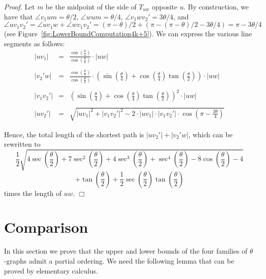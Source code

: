 \documentclass[12pt]{article}
\newenvironment{proof}{\emph{Proof.}}{\hfill $\Box$\\}
\newcommand{\canon}[2]{\ensuremath{T_{#1 #2}}}
\begin{document}
\begin{proof}
Let $m$ be the midpoint of the side of \canon{u}{w} opposite $u$. By construction, we have that $\angle v_1 u m = \theta/2$, $\angle w u m = \theta/4$, $\angle v_1 w v_2' = 3\theta/4$, and $\angle u v_1 v_2' = \angle u v_1 w + \angle w v_1 v_2' = (\pi - \theta)/2 + (\pi - (\pi - \theta)/2 - 3\theta/4) = \pi - 3\theta/4$ (see Figure~\ref{fig:LowerBoundComputation4k+5}). We can express the various line segments as follows: 
\begin{eqnarray*}
  |u v_1| &=& \frac{\cos \left( \frac{\theta}{4} \right)}{\cos \left( \frac{\theta}{2} \right)} \cdot |u w| \\ \\
|v_2' w| &=& \frac{\cos \left( \frac{\theta}{4} \right)}{\cos \left( \frac{\theta}{2} \right)} \cdot \left( \sin \left( \frac{\theta}{4} \right) + \cos \left( \frac{\theta}{4} \right) \tan \left( \frac{\theta}{2} \right) \right) \cdot |u w| \\ \\
|v_1 v_2'| &=&  \left( \sin \left( \frac{\theta}{4} \right) + \cos \left( \frac{\theta}{4} \right) \tan \left( \frac{\theta}{2} \right) \right)^2 \cdot |u w| \\ \\
  |u v_2'| &=& \sqrt{|u v_1|^2 + |v_1 v_2'|^2 - 2 \cdot |u v_1| \cdot |v_1 v_2'| \cdot \cos \left( \pi - \frac{3\theta}{4} \right)}
\end{eqnarray*}

Hence, the total length of the shortest path is $|u v_2'| + |v_2' w|$, which can be rewritten to \[ \frac{1}{2} \sqrt{4\sec\left(\frac{\theta}{2}\right) + 7\sec^2\left(\frac{\theta}{2}\right) + 4\sec^3\left(\frac{\theta}{2}\right) + \sec^4\left(\frac{\theta}{2}\right) - 8\cos\left(\frac{\theta}{2}\right) - 4}\] \[+ \tan\left(\frac{\theta}{2}\right) + \frac{1}{2}\sec\left(\frac{\theta}{2}\right)\tan\left(\frac{\theta}{2}\right)\]  times the length of $u w$.
\end{proof}


\section{Comparison}
\label{sec:Comparison}
In this section we prove that the upper and lower bounds of the four families of $\theta$-graphs admit a partial ordering. We need the following lemma that can be proved by elementary calculus. 
\end{document}
